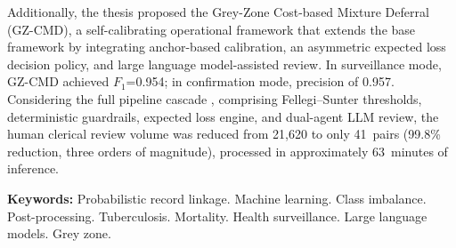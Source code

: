 \documentclass[12pt,a4paper,openany]{book}
\newcommand{\printnomenclature}{}
\begin{document}
Additionally, the thesis proposed the Grey-Zone Cost-based Mixture Deferral (GZ-CMD), a self-calibrating operational framework that extends the base framework by integrating anchor-based calibration, an asymmetric expected loss decision policy, and large language model-assisted review. In surveillance mode, GZ-CMD achieved $F_1$=0.954; in confirmation mode, precision of 0.957. Considering the full pipeline cascade , comprising Fellegi--Sunter thresholds, deterministic guardrails, expected loss engine, and dual-agent LLM review, the human clerical review volume was reduced from 21,620 to only 41~pairs (99.8\% reduction, three orders of magnitude), processed in approximately 63~minutes of inference.

\vspace{15pt}

\textbf{Keywords:} Probabilistic record linkage. Machine learning. Class imbalance. Post-processing. Tuberculosis. Mortality. Health surveillance. Large language models. Grey zone.





\newpage
{}
{}
\listoffigures

\newpage
{}
{}
\listoftables



\printnomenclature





\newpage
{}
{}
\tableofcontents


\pagestyle{fancy}

\mainmatter
\end{document}
